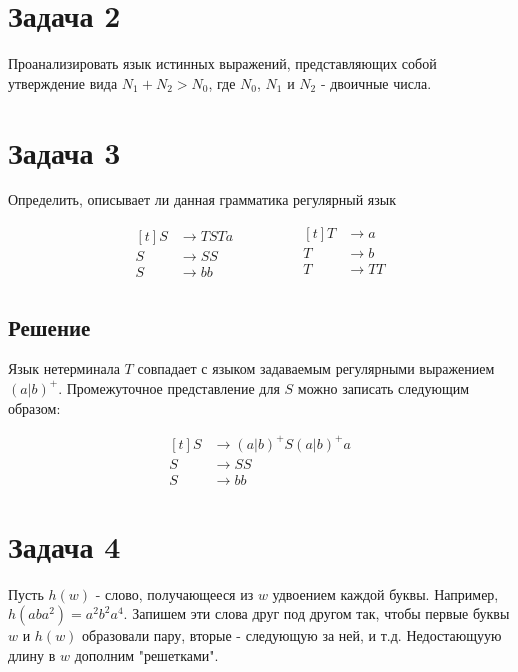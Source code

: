 \documentclass[a4paper, 14pt]{article}
\begin{document}
\section{Задача 2}
Проанализировать язык истинных выражений, представляющих собой утверждение вида $N_1 + N_2 > N_0$, где $N_0$, $N_1$ и $N_2$ - двоичные числа.


\section{Задача 3}

Определить, описывает ли данная грамматика регулярный язык 

\begin{equation*}
	\begin{aligned}[t]
		S &\rightarrow TSTa\\  
		S &\rightarrow SS\\
		S &\rightarrow bb
	\end{aligned}
	\qquad \ \qquad
	\begin{aligned}[t]
		T &\rightarrow a\\
		T &\rightarrow b\\
		T &\rightarrow TT\\
	\end{aligned}
\end{equation*}

\newpage

\subsection{Решение}

Язык нетерминала $T$ совпадает с языком задаваемым регулярными выражением $(a|b)^{+}$.
Промежуточное представление для $S$ можно записать следующим образом:

\begin{equation*}
	\begin{aligned}[t]
		S &\rightarrow (a|b)^{+}S(a|b)^{+}a\\  
		S &\rightarrow SS\\
		S &\rightarrow bb
	\end{aligned}
\end{equation*}


\section{Задача 4}

Пусть $h(w)$ - слово, получающееся из $w$ удвоением каждой буквы. Например, $h(aba^2) = a^{2}b^{2}a^{4}$. Запишем эти слова друг под другом так, чтобы первые буквы $w$ и $h(w)$ образовали пару, вторые - следующую за ней, и т.д. Недостающуую длину в $w$ дополним "решетками".
\end{document}
